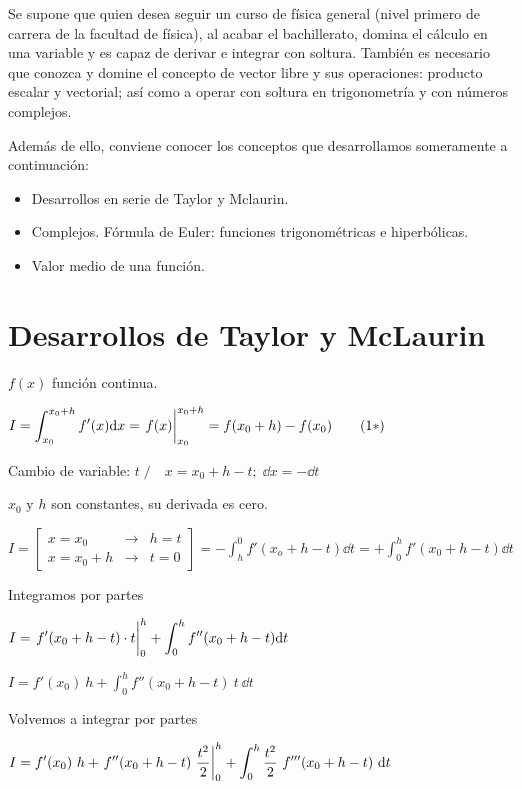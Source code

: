 \textsf{Se supone que quien desea seguir un curso de física general (nivel primero de carrera de la facultad de física), al acabar el bachillerato, domina el cálculo en una variable y es capaz de derivar e integrar con soltura. También es necesario que conozca y domine el concepto de vector libre y sus operaciones: producto escalar y vectorial; así como a operar con soltura en trigonometría y con números complejos.}

\textsf{Además de ello, conviene conocer los conceptos que desarrollamos someramente a continuación:} 
\vspace{-1mm} \begin{itemize}
\vspace{-1mm} \item \textsf{Desarrollos en serie de Taylor y Mclaurin.}
\vspace{-1mm} \item \textsf{Complejos. Fórmula de Euler: funciones trigonométricas e hiperbólicas.}
\vspace{-1mm} \item \textsf{Valor medio de una función.}	
\end{itemize}


\section{Desarrollos de Taylor y McLaurin} \label{McLaurin}

$f(x)$ función continua.

$I=\displaystyle \int_{x_0}^{x_0+h}f'(x) \dd x= \eval{f(x)}_{x_0}^{x_0+h}=f(x_0+h)-f(x_0) \qquad (1*)$

Cambio de variable: $t \; / \quad  x=x_0+h-t;\; \dd x= -\dd t$

$x_0 \text{ y } h$ son constantes, su derivada es cero.

$I=
\left[ \begin{matrix} x=x_0 & \to & h=t \\ x=x_0+h & \to & t=0  \end{matrix} \right]
=\displaystyle - \int_h^0 f'(x_o+h-t) \dd t=+\int_0^h f'(x_0+h-t) \dd t$

Integramos por partes

$I=\displaystyle \eval{f'(x_0+h-t)\cdot t}_0^h + \int_0^h f''(x_0+h-t) \dd t$

$I=\displaystyle f'(x_0)\ h+ \int_0^h f''(x_0+h-t)\ t \ \dd t$

Volvemos a integrar por partes

$I=\displaystyle f'(x_0)\ h+ \eval{f''(x_0+h-t)\ \dfrac {t^2}{2}}_0^h+\int_0^h \dfrac {t^2}{2}\ f'''(x_0+h-t) \ \dd t$

